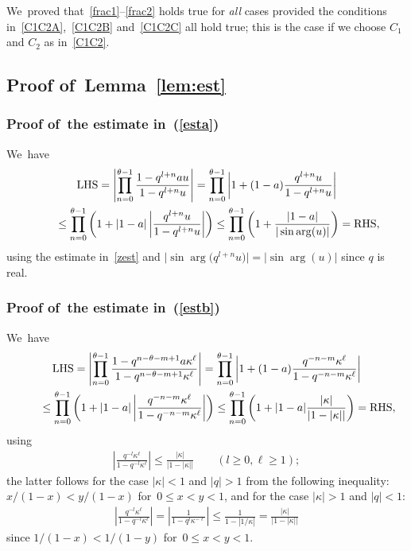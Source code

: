 We~proved that~\eqref{frac1}--\eqref{frac2} holds true for {\em all} cases provided the conditions in~\eqref{C1C2A},~\eqref{C1C2B} and~\eqref{C1C2C} all hold true; this is the case if we choose $C_1$ and $C_2$ as in~\eqref{C1C2}.

\subsection[Proof of~Lemma~B1]{Proof of~Lemma~\ref{lem:est}}\label{app:prooflem:est}
\subsubsection[Proof of~the estimate in (B.5)]{Proof of~the estimate in~(\ref{esta})}
We~have
\begin{gather*}
\text{LHS} = \left|\prod_{n=0}^{\theta-1}\frac{1-q^{l+n}au}{1-q^{l+n}u} \right| = \prod_{n=0}^{\theta-1}\left|1+(1-a)\frac{q^{l+n}u}{1-q^{l +n}u} \right|
\\ \hphantom{\text{LHS}}
{}\leq \prod_{n=0}^{\theta-1}\left(1+|1-a|\left|\frac{q^{l+n}u}{1-q^{l+n}u}\right| \right)\leq \prod_{n=0}^{\theta-1}\left(1+\frac{|1-a|}{|\sin\arg(u)|}\right) =
\text{RHS},
\end{gather*}
using the estimate in~\eqref{zest} and $\big|\sin\arg\big(q^{l+n}u\big)\big|=|\sin\arg(u)|$ since $q$ is real.

\subsubsection[Proof of~the estimate in (B.6)]{Proof of~the estimate in~(\ref{estb})}
\label{app:estb}
We~have
\begin{gather*}
\text{LHS} = \left| \prod_{n=0}^{\theta-1} \frac{1- q^{n-\theta-m+1}a\kappa^\ell }{1-q^{n-\theta-m+1} \kappa^\ell } \right| = \prod_{n=0}^{\theta-1}\left| 1+(1-a)\frac{q^{-n-m}\kappa^\ell}{1-q^{-n-m}\kappa^\ell}\right|
\\ \hphantom{\text{LHS}}
{}\leq \prod_{n=0}^{\theta-1}\left( 1+|1-a|\left|\frac{q^{-n-m}\kappa^\ell}{1-q^{-n-m}\kappa^\ell}\right|\right)
\leq \prod_{n=0}^{\theta-1}\left( 1+|1-a|\frac{|\kappa|}{|1-|\kappa||}\right) =\text{RHS},
\end{gather*}
using
\begin{gather*}
\left|\frac{q^{-l}\kappa^\ell}{1-q^{-l}\kappa^\ell}\right|\leq \frac{|\kappa|}{|1-|\kappa||}\qquad
(l\geq 0, \ell\geq 1);
\end{gather*}
the latter follows for the case $|\kappa|<1$ and $|q|>1$ from the following inequality: $x/(1-x)<y/(1-x)$ for~$0\leq x<y<1$, and for the case $|\kappa|>1$ and $|q|<1$:
\begin{gather*}
\left|\frac{q^{-l}\kappa^\ell}{1-q^{-l}\kappa^\ell}\right| = \left|\frac{1}{1-q^{l}\kappa^{-\ell}}\right| \leq \frac1{1-|1/\kappa|} = \frac{|\kappa|}{|1-|\kappa||}
\end{gather*}
since $1/(1-x)<1/(1-y)$ for~$0\leq x<y<1$.

